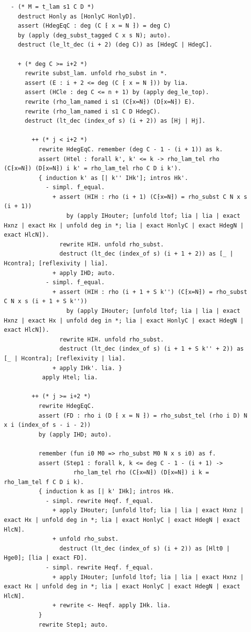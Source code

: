 \begin{latin}
\begin{verbatim}
  - (* M = t_lam s1 C D *)
    destruct Honly as [HonlyC HonlyD].
    assert (HdegEqC : deg (C ⁅ x ≔ N ⁆) = deg C)
    by (apply (deg_subst_tagged C x s N); auto).
    destruct (le_lt_dec (i + 2) (deg C)) as [HdegC | HdegC].

    + (* deg C >= i+2 *)
      rewrite subst_lam. unfold rho_subst in *.
      assert (E : i + 2 <= deg (C ⁅ x ≔ N ⁆)) by lia.
      assert (HCle : deg C <= n + 1) by (apply deg_le_top).
      rewrite (rho_lam_named i s1 (C⁅x≔N⁆) (D⁅x≔N⁆) E).
      rewrite (rho_lam_named i s1 C D HdegC).
      destruct (lt_dec (index_of s) (i + 2)) as [Hj | Hj].

        ++ (* j < i+2 *)
          rewrite HdegEqC. remember (deg C - 1 - (i + 1)) as k.
          assert (Htel : forall k', k' <= k -> rho_lam_tel rho (C⁅x≔N⁆) (D⁅x≔N⁆) i k' = rho_lam_tel rho C D i k').
          { induction k' as [| k'' IHk']; intros Hk'.
            - simpl. f_equal.
              + assert (HIH : rho (i + 1) (C⁅x≔N⁆) = rho_subst C N x s (i + 1))
                  by (apply IHouter; [unfold ltof; lia | lia | exact Hxnz | exact Hx | unfold deg in *; lia | exact HonlyC | exact HdegN | exact HlcN]).
                rewrite HIH. unfold rho_subst.
                destruct (lt_dec (index_of s) (i + 1 + 2)) as [_ | Hcontra]; [reflexivity | lia].
              + apply IHD; auto.
            - simpl. f_equal.
              + assert (HIH : rho (i + 1 + S k'') (C⁅x≔N⁆) = rho_subst C N x s (i + 1 + S k''))
                  by (apply IHouter; [unfold ltof; lia | lia | exact Hxnz | exact Hx | unfold deg in *; lia | exact HonlyC | exact HdegN | exact HlcN]).
                rewrite HIH. unfold rho_subst.
                destruct (lt_dec (index_of s) (i + 1 + S k'' + 2)) as [_ | Hcontra]; [reflexivity | lia].
              + apply IHk'. lia. }
           apply Htel; lia.

        ++ (* j >= i+2 *)
          rewrite HdegEqC.
          assert (FD : rho i (D ⁅ x ≔ N ⁆) = rho_subst_tel (rho i D) N x i (index_of s - i - 2))
          by (apply IHD; auto).

          remember (fun i0 M0 => rho_subst M0 N x s i0) as f.
          assert (Step1 : forall k, k <= deg C - 1 - (i + 1) ->
                    rho_lam_tel rho (C⁅x≔N⁆) (D⁅x≔N⁆) i k = rho_lam_tel f C D i k).
          { induction k as [| k' IHk]; intros Hk.
            - simpl. rewrite Heqf. f_equal.
              + apply IHouter; [unfold ltof; lia | lia | exact Hxnz | exact Hx | unfold deg in *; lia | exact HonlyC | exact HdegN | exact HlcN].
              + unfold rho_subst.
                destruct (lt_dec (index_of s) (i + 2)) as [Hlt0 | Hge0]; [lia | exact FD].
            - simpl. rewrite Heqf. f_equal.
              + apply IHouter; [unfold ltof; lia | lia | exact Hxnz | exact Hx | unfold deg in *; lia | exact HonlyC | exact HdegN | exact HlcN].
              + rewrite <- Heqf. apply IHk. lia.
          }
          rewrite Step1; auto.


\end{verbatim}
\end{latin}
